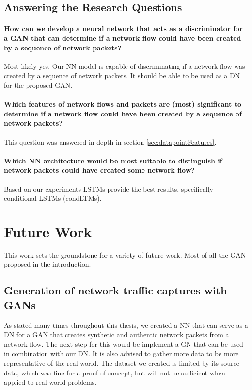\documentclass[
	ngerman,
	ruledheaders=section,%
	class=report,%
	thesis={type=bachelor},%
	accentcolor=9c,%
	custommargins=true,%
	marginpar=false,%
	parskip=half-,%
	fontsize=11pt,%
]{tudapub}
\begin{document}
\subsection{Answering the Research Questions}
\label{sec:answers}

\paragraph{How can we develop a neural network that acts as a discriminator for a GAN that can determine if a network flow could have been created by a sequence of network packets?}
Most likely yes.
Our NN model is capable of discriminating if a network flow was created by a sequence of network packets.
It should be able to be used as a DN for the proposed GAN.

\paragraph{Which features of network flows and packets are (most) significant to determine if a network flow could have been created by a sequence of network packets?}
This question was answered in-depth in section \ref{sec:datapointFeatures}.

\paragraph{Which NN architecture would be most suitable to distinguish if network packets could have created some network flow?}
Based on our experiments LSTMs provide the best results, specifically conditional LSTMs (condLTMs).

\section{Future Work}
\label{sec:futureWork}

This work sets the groundstone for a variety of future work.
Most of all the GAN proposed in the introduction.

\subsection{Generation of network traffic captures with GANs}
\label{sec:futureGAN}

As stated many times throughout this thesis, we created a NN that can serve as a DN for a GAN that creates synthetic and authentic network packets from a network flow.
The next step for this would be implement a GN that can be used in combination with our DN.
It is also advised to gather more data to be more representative of the real world.
The dataset we created is limited by its source data, which was fine for a proof of concept, but will not be sufficient when applied to real-world problems.
\end{document}
